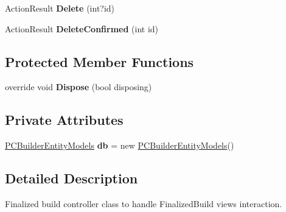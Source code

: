 \begin{DoxyCompactItemize}
\item 
Action\+Result {\bfseries Delete} (int?id)\hypertarget{class_p_c_builder_m_v_c_1_1_controllers_1_1_finalized_build_controller_a67108920f596310eb9aee37122b5ccbe}{}\label{class_p_c_builder_m_v_c_1_1_controllers_1_1_finalized_build_controller_a67108920f596310eb9aee37122b5ccbe}

\item 
Action\+Result {\bfseries Delete\+Confirmed} (int id)\hypertarget{class_p_c_builder_m_v_c_1_1_controllers_1_1_finalized_build_controller_a1eafcada1b37f4df54b3a202209ee6ca}{}\label{class_p_c_builder_m_v_c_1_1_controllers_1_1_finalized_build_controller_a1eafcada1b37f4df54b3a202209ee6ca}

\end{DoxyCompactItemize}
\subsection*{Protected Member Functions}
\begin{DoxyCompactItemize}
\item 
override void {\bfseries Dispose} (bool disposing)\hypertarget{class_p_c_builder_m_v_c_1_1_controllers_1_1_finalized_build_controller_a5a502f607f19ae30e5b8b3c7b699a088}{}\label{class_p_c_builder_m_v_c_1_1_controllers_1_1_finalized_build_controller_a5a502f607f19ae30e5b8b3c7b699a088}

\end{DoxyCompactItemize}
\subsection*{Private Attributes}
\begin{DoxyCompactItemize}
\item 
\hyperlink{class_p_c_builder_m_v_c_1_1_models_1_1_p_c_builder_entity_models}{P\+C\+Builder\+Entity\+Models} {\bfseries db} = new \hyperlink{class_p_c_builder_m_v_c_1_1_models_1_1_p_c_builder_entity_models}{P\+C\+Builder\+Entity\+Models}()\hypertarget{class_p_c_builder_m_v_c_1_1_controllers_1_1_finalized_build_controller_ab36401b0c2a8a3eb9bf898d8123423cc}{}\label{class_p_c_builder_m_v_c_1_1_controllers_1_1_finalized_build_controller_ab36401b0c2a8a3eb9bf898d8123423cc}

\end{DoxyCompactItemize}


\subsection{Detailed Description}
Finalized build controller class to handle Finalized\+Build views interaction. 

